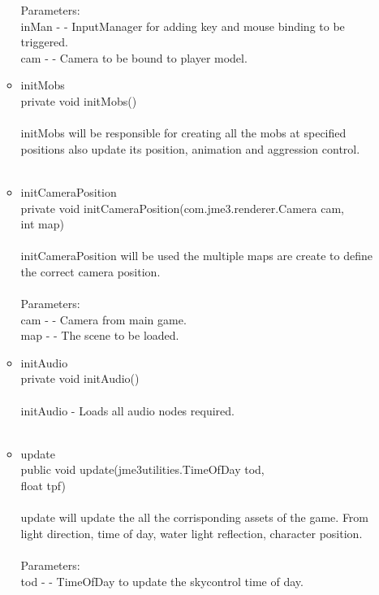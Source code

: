 \documentclass[letterpaper]{article}
\begin{document}
\begin{itemize}
\begin{itemize}
													Parameters: \\
													inMan - - InputManager for adding key and mouse binding to be triggered. \\
													cam - - Camera to be bound to player model.\\
											\item	initMobs \\
													private void initMobs() \\ \\
													initMobs will be responsible for creating all the mobs at specified positions also update its position, animation and aggression control. \\ \\
											\item	initCameraPosition \\
													private void initCameraPosition(com.jme3.renderer.Camera cam, \\
				                      int map) \\ \\
													initCameraPosition will be used the multiple maps are create to define the correct camera position. \\ \\
													Parameters: \\
													cam - - Camera from main game. \\
													map - - The scene to be loaded. \\
											\item	initAudio \\
													private void initAudio() \\ \\
													initAudio - Loads all audio nodes required. \\ \\
											\item	update \\
													public void update(jme3utilities.TimeOfDay tod, \\
				          float tpf) \\ \\
													update will update the all the corrisponding assets of the game. From light direction, time of day, water light reflection, character position. \\ \\
													Parameters: \\
													tod - - TimeOfDay to update the skycontrol time of day. \\

\end{itemize}
\end{itemize}
\end{document}

